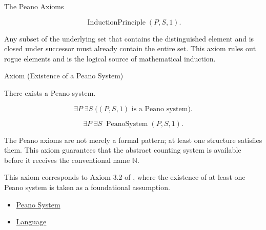 \begin{topicbox}{The Peano Axioms}
\begin{remark*}
\[
\operatorname{InductionPrinciple}(P,S,1).
\]
\end{remark*}

\begin{remark*}[Interpretation]
Any subset of the underlying set that contains the distinguished element and is
closed under successor must already contain the entire set. This axiom rules
out rogue elements and is the logical source of mathematical induction.
\end{remark*}

\NoLocalDependencies

\begin{axiombox}{Axiom (Existence of a Peano System)}
\begin{axiom}
\label{ax:peano-system-existence}
There exists a Peano system.
\end{axiom}
\end{axiombox}

\begin{remark*}
\[
\exists P\;\exists S\;\bigl((P,S,1)\text{ is a Peano system}\bigr).
\]
\end{remark*}

\begin{remark*}
\[
\exists P\;\exists S\;\operatorname{PeanoSystem}(P,S,1).
\]
\end{remark*}

\begin{remark*}[Interpretation]
The Peano axioms are not merely a formal pattern; at least one structure
satisfies them. This axiom guarantees that the abstract counting system is
available before it receives the conventional name $\mathbb{N}$.
\end{remark*}

\begin{remark*}
This axiom corresponds to Axiom 3.2 of
\citet{FefermanNumberSystems1964}, where the existence of at least one Peano
system is taken as a foundational assumption.
\end{remark*}

\begin{dependencies}
\begin{itemize}
  \item \hyperref[def:peano-system]{Peano System}
  \item \hyperref[def:language]{Language}
\end{itemize}
\end{dependencies}
\end{topicbox}
